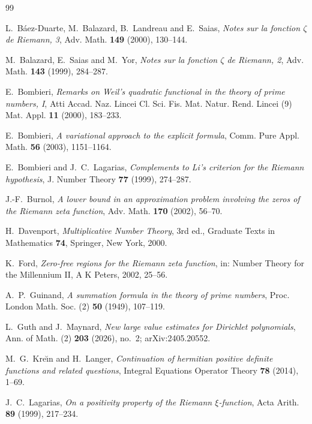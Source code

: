 \documentclass[11pt,reqno]{amsart}
\theoremstyle{plain}
\theoremstyle{definition}
\begin{document}
\begin{thebibliography}{99}

 L.~Báez-Duarte, M.~Balazard, B.~Landreau and E.~Saias,
\emph{Notes sur la fonction $\zeta$ de Riemann, 3}, Adv. Math. \textbf{149} (2000), 130--144.

 M.~Balazard, E.~Saias and M.~Yor,
\emph{Notes sur la fonction $\zeta$ de Riemann, 2}, Adv. Math. \textbf{143} (1999), 284--287.

 E.~Bombieri,
\emph{Remarks on Weil's quadratic functional in the theory of prime numbers, I},
Atti Accad. Naz. Lincei Cl. Sci. Fis. Mat. Natur. Rend. Lincei (9) Mat. Appl. \textbf{11} (2000),
183--233.

 E.~Bombieri,
\emph{A variational approach to the explicit formula},
Comm. Pure Appl. Math. \textbf{56} (2003), 1151--1164.

 E.~Bombieri and J.~C.~Lagarias,
\emph{Complements to Li's criterion for the Riemann hypothesis},
J. Number Theory \textbf{77} (1999), 274--287.

 J.-F.~Burnol,
\emph{A lower bound in an approximation problem involving the zeros of the Riemann zeta function},
Adv. Math. \textbf{170} (2002), 56--70.

 H.~Davenport,
\emph{Multiplicative Number Theory}, 3rd ed., Graduate Texts in Mathematics \textbf{74},
Springer, New York, 2000.

 K.~Ford,
\emph{Zero-free regions for the Riemann zeta function},
in: Number Theory for the Millennium II, A K Peters, 2002, 25--56.

 A.~P.~Guinand,
\emph{A summation formula in the theory of prime numbers},
Proc. London Math. Soc. (2) \textbf{50} (1949), 107--119.

 L.~Guth and J.~Maynard,
\emph{New large value estimates for Dirichlet polynomials},
Ann. of Math. (2) \textbf{203} (2026), no.~2; arXiv:2405.20552.

 M.~G.~Kre\u\i n and H.~Langer,
\emph{Continuation of hermitian positive definite functions and related questions},
Integral Equations Operator Theory \textbf{78} (2014), 1--69.

 J.~C.~Lagarias,
\emph{On a positivity property of the Riemann $\xi$-function},
Acta Arith. \textbf{89} (1999), 217--234.


\end{thebibliography}
\end{document}
